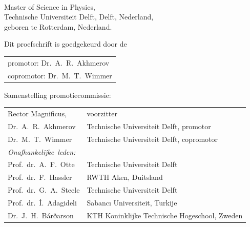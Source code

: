 \begin{titlepage}
\begin{center}
\makeatletter
{\Large\titlefont\bfseries\@firstname\ {\titleshape\@lastname}}
\makeatother

\bigskip
\bigskip

Master of Science in Physics, \\
Technische Universiteit Delft, Delft, Nederland, \\
geboren te Rotterdam, Nederland.

\vspace*{2\bigskipamount}

\end{center}

\clearpage
\thispagestyle{empty}

\noindent Dit proefschrift is goedgekeurd door de

\medskip\noindent
\begin{tabular}{l}
    promotor:  Dr.\ A.\ R.\ Akhmerov \\
    copromotor: Dr.\ M.\ T.\ Wimmer
\end{tabular}

\bigskip
\noindent Samenstelling promotiecommissie:

\medskip\noindent
\begin{tabular}{p{4cm}l}
    Rector Magnificus, & voorzitter \\
    Dr.\ A.\ R.\ Akhmerov & Technische Universiteit Delft, promotor \\
    Dr.\ M.\ T.\ Wimmer & Technische Universiteit Delft, copromotor \\

    \medskip
    \mbox{\emph{Onafhankelijke leden:}} & \\
    Prof.\ dr.\ A.\ F.\ Otte & Technische Universiteit Delft \\  %
    Prof.\ dr.\ F.\ Hassler & RWTH Aken, Duitsland \\  %
    Prof.\ dr.\ G.\ A.\ Steele & Technische Universiteit Delft \\  %
    Prof.\ dr.\ İ.\ Adagideli & Sabancı Universiteit, Turkije \\  %
    Dr.\ J.\ H.\ Bárðarson & KTH Koninklijke Technische Hogeschool, Zweden  %



\end{tabular}
\end{titlepage}
